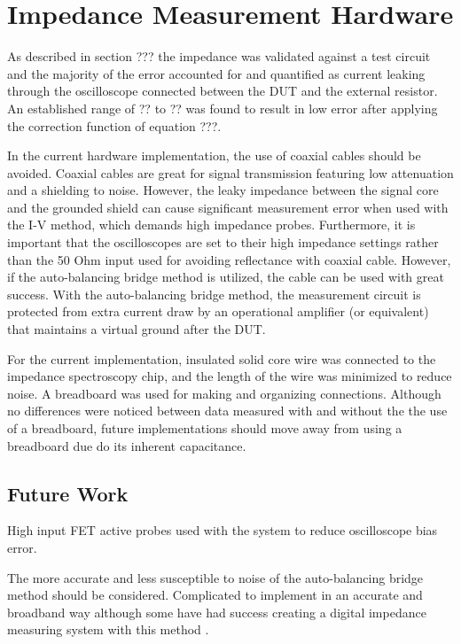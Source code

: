 \section{Impedance Measurement Hardware}

\par As described in section ??? the impedance was validated against a test circuit and the majority of the error accounted for and quantified as current leaking through the oscilloscope connected between the DUT and the external resistor. An established range of ?? to ?? was found to result in low error after applying the correction function of equation ???.

\par In the current hardware implementation, the use of coaxial cables should be avoided. Coaxial cables are great for signal transmission featuring low attenuation and a shielding to noise. However, the leaky impedance between the signal core and the grounded shield can cause significant measurement error when used with the I-V method, which demands high impedance probes. Furthermore, it is important that the oscilloscopes are set to their high impedance settings rather than the 50 Ohm input used for avoiding reflectance with coaxial cable. However, if the auto-balancing bridge method is utilized, the cable can be used with great success. With the auto-balancing bridge method, the measurement circuit is protected from extra current draw by an operational amplifier (or equivalent) that maintains a virtual ground after the DUT. 

\par For the current implementation, insulated solid core wire was connected to the impedance spectroscopy chip, and the length of the wire was minimized to reduce noise. A breadboard was used for making and organizing connections. Although no differences were noticed between data measured with and without the the use of a breadboard, future implementations should move away from using a breadboard due do its inherent capacitance.

\subsection*{Future Work}

\par High input FET active probes used with the system to reduce oscilloscope bias error. 

\par The more accurate and less susceptible to noise of the auto-balancing bridge method should be considered. Complicated to implement in an accurate and broadband way although some have had success creating a digital impedance measuring system with this method \cite{li_high-speed_2013}.

